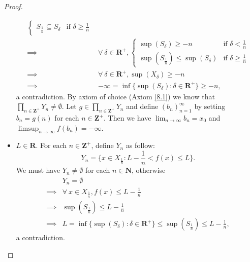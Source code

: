 \begin{proof}
\begin{itemize}
\begin{align*}
\begin{cases}
                      S_{\frac{1}{n}} \subseteq S_{\delta}    & \text{if } \delta \geq \frac{1}{n}
                  \end{cases}          \\
                  \implies & \forall\ \delta \in \mathbf{R}^+, \begin{cases}
                      \sup(S_{\delta}) \geq -n                    & \text{if } \delta < \frac{1}{n}    \\
                      \sup(S_{\frac{1}{n}}) \leq \sup(S_{\delta}) & \text{if } \delta \geq \frac{1}{n}
                  \end{cases}          \\
                  \implies & \forall\ \delta \in \mathbf{R}^+, \sup(X_{\delta}) \geq -n            \\
                  \implies & -\infty = \inf\{\sup(S_{\delta}) : \delta \in \mathbf{R}^+\} \geq -n,
              \end{align*}
              a contradiction.
              By axiom of choice (Axiom \ref{8.1}) we know that \(\prod_{n \in \mathbf{Z}^+} Y_n \neq \emptyset\).
              Let \(g \in \prod_{n \in \mathbf{Z}^+} Y_n\) and define \((b_n)_{n = 1}^\infty\) by setting \(b_n = g(n)\) for each \(n \in \mathbf{Z}^+\).
              Then we have \(\lim_{n \to \infty} b_n = x_0\) and \(\limsup_{n \to \infty} f(b_n) = -\infty\).
        \item \(L \in \mathbf{R}\).
              For each \(n \in \mathbf{Z}^+\), define \(Y_n\) as follow:
              \[
                  Y_n = \{x \in X_{\frac{1}{n}} : L - \frac{1}{n} < f(x) \leq L\}.
              \]
              We must have \(Y_n \neq \emptyset\) for each \(n \in \mathbf{N}\), otherwise
              \begin{align*}
                           & Y_n = \emptyset                                                                                         \\
                  \implies & \forall\ x \in X_{\frac{1}{n}}, f(x) \leq L - \frac{1}{n}                                               \\
                  \implies & \sup(S_{\frac{1}{n}}) \leq L - \frac{1}{n}                                                              \\
                  \implies & L = \inf\{\sup(S_{\delta}) : \delta \in \mathbf{R}^+\} \leq \sup(S_{\frac{1}{n}}) \leq L - \frac{1}{n},
              \end{align*}
              a contradiction.

\end{itemize}
\end{proof}
